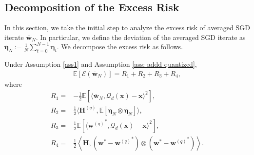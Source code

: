 \documentclass[11pt, letterpaper]{article}
\begin{document}
\subsection{Decomposition of the Excess Risk}
\label{Decomposition of the Excess Risk}
In this section, we take the initial step to analyze the excess risk of averaged SGD iterate $\overline{\mathbf{w}}_N$. In particular, we define the deviation of the averaged SGD iterate as $\overline{\boldsymbol{\eta}}_{N}:=\frac{1}{N}\sum_{t=0}^{N-1}\boldsymbol{\eta}_{t}$. We decompose the excess risk as follows.
\begin{lemma}
\label{Excess Risk Decomposition}
    Under Assumption \ref{ass1} and Assumption \ref{ass: addd quantized},
    \begin{equation*}
        \begin{aligned}
            \mathbb{E}[\mathcal{E}(\overline{\mathbf{w}}_N)]=R_1+R_2+R_3+R_4,
        \end{aligned}
    \end{equation*}
    where
    \begin{equation*}
        \begin{aligned}
            R_1=&-\frac{1}{2}\mathbb{E}\left[\langle\overline{\mathbf{w}}_N, \mathcal{Q}_d(\mathbf{x})-\mathbf{x} \rangle^2\right],\\
            R_2=&\frac{1}{2}\langle\mathbf{H}^{(q)},\mathbb{E}[\overline{\boldsymbol{\eta}}_N\otimes\overline{\boldsymbol{\eta}}_N]\rangle,\\
            R_3=&\frac{1}{2}\mathbb{E}\left[\langle {\mathbf{w}^{(q)}}^*,\mathcal{Q}_d(\mathbf{x})-\mathbf{x}\rangle^2\right],\\
            R_4=&\frac{1}{2}\left\langle\mathbf{H},({\mathbf{w}}^*-{\mathbf{w}^{(q)}}^*)\otimes({\mathbf{w}}^*-{\mathbf{w}^{(q)}}^*)\right\rangle.
        \end{aligned}
    \end{equation*}
\end{lemma}
\end{document}
